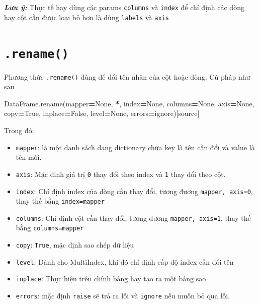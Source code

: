 \documentclass[
]{book}
\makeatletter
\newenvironment{Shaded}{\begin{snugshade}}{\end{snugshade}}
\newcommand{\NormalTok}[1]{#1}
\newcommand{\OperatorTok}[1]{\textcolor[rgb]{0.81,0.36,0.00}{\textbf{#1}}}
\newcommand{\StringTok}[1]{\textcolor[rgb]{0.31,0.60,0.02}{#1}}
\newcommand{\VariableTok}[1]{\textcolor[rgb]{0.00,0.00,0.00}{#1}}
\newenvironment{kframe}{%
\medskip{}
\setlength{\fboxsep}{.8em}
 \def\at@end@of@kframe{}%
 \ifinner\ifhmode%
  \def\at@end@of@kframe{\end{minipage}}%
  \begin{minipage}{\columnwidth}%
 \fi\fi%
 \def\FrameCommand##1{\hskip\@totalleftmargin \hskip-\fboxsep
 \colorbox{shadecolor}{##1}\hskip-\fboxsep
     \hskip-\linewidth \hskip-\@totalleftmargin \hskip\columnwidth}%
 \MakeFramed {\advance\hsize-\width
   \@totalleftmargin\z@ \linewidth\hsize
   \@setminipage}}%
 {\par\unskip\endMakeFramed%
 \at@end@of@kframe}
\newenvironment{rmdblock}[1]
  {
  \begin{itemize}
  \renewcommand{\labelitemi}{
    \raisebox{-.7\height}[0pt][0pt]{
      {\setkeys{Gin}{width=3em,keepaspectratio}\texttt{[image: images/\#1]}}
    }
  }
  \setlength{\fboxsep}{1em}
  \begin{kframe}
  \item
  }
  {
  \end{kframe}
  \end{itemize}
  }
\newenvironment{rmdnote}
  {\begin{rmdblock}{note}}
  {\end{rmdblock}}
\makeatother
\begin{document}
\begin{rmdnote}
\textbf{\emph{Lưu ý:}}
Thực tế hay dùng các params \texttt{columns} và \texttt{index} để chỉ định các dòng hay cột cần được loại bỏ hơn là dùng \texttt{labels} và \texttt{axis}
\end{rmdnote}

\hypertarget{rename}{%
\section{\texorpdfstring{\texttt{.rename()}}{.rename()}}\label{rename}}

Phương thức \texttt{.rename()} dùng để đổi tên nhãn của cột hoặc dòng. Cú pháp như sau

\begin{Shaded}
\begin{Highlighting}[]
\NormalTok{DataFrame.rename(mapper}\OperatorTok{=}\VariableTok{None}\NormalTok{, }\OperatorTok{*}\NormalTok{, index}\OperatorTok{=}\VariableTok{None}\NormalTok{, columns}\OperatorTok{=}\VariableTok{None}\NormalTok{, axis}\OperatorTok{=}\VariableTok{None}\NormalTok{, copy}\OperatorTok{=}\VariableTok{True}\NormalTok{, inplace}\OperatorTok{=}\VariableTok{False}\NormalTok{, level}\OperatorTok{=}\VariableTok{None}\NormalTok{, errors}\OperatorTok{=}\StringTok{\textquotesingle{}ignore\textquotesingle{}}\NormalTok{)[source]}
\end{Highlighting}
\end{Shaded}

Trong đó:

\begin{itemize}
\item
  \texttt{mapper}: là một danh sách dạng dictionary chứa key là tên cần đổi và value là tên mới.
\item
  \texttt{axis}: Mặc đinh giá trị \texttt{0} thay đổi theo index và \texttt{1} thay đổi theo cột.
\item
  \texttt{index}: Chỉ định index của dòng cần thay đổi, tương đương \texttt{mapper,\ axis=0}, thay thế bằng \texttt{index=mapper}
\item
  \texttt{columns}: Chỉ định cột cần thay đổi, tương đương \texttt{mapper,\ axis=1}, thay thế bằng \texttt{columns=mapper}
\item
  \texttt{copy}: \texttt{True}, mặc định sao chép dữ liệu
\item
  \texttt{level}: Dành cho MultiIndex, khi đó chỉ định cấp độ index cần đổi tên
\item
  \texttt{inplace}: Thực hiện trên chính bảng hay tạo ra một bảng sao
\item
  \texttt{errors}: mặc định \texttt{raise} sẽ trả ra lỗi và \texttt{ignore} nếu muốn bỏ qua lỗi.
\end{itemize}
\end{document}
